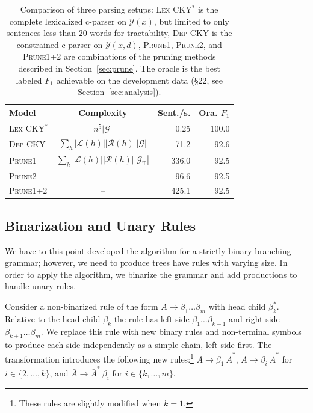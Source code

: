 \documentclass[11pt,letterpaper]{article}
\newcommand{\rules}{\mathcal{G}}
\newcommand{\LeftS}{\mathcal{L} }
\newcommand{\RightS}{\mathcal{R} }
\newcommand{\Rule}[3]{#1 \rightarrow #2\ #3}
\begin{document}
\begin{table}
  \centering
  \footnotesize
  \hspace*{-0.3cm}
  \begin{tabular}{lcrr}
    \toprule
    Model & Complexity & Sent./s. & Ora. $F_1$  \\
    
    \midrule
    \textsc{Lex CKY$^*$} & $n^5|\rules|$ &  0.25  & 100.0  \\
    \textsc{Dep CKY}      & $\sum_h |\LeftS(h)| |\RightS(h)| |\rules|$ &  71.2  & 92.6    \\
    \textsc{Prune1}   & $\sum_h |\LeftS(h)|| \RightS(h)| |\rules_{\mathrm{T}}|$ &  336.0 & 92.5    \\
    \textsc{Prune2}   & -- &  96.6  & 92.5 \\
    \textsc{Prune1+2} & -- &  425.1 & 92.5 \\
    \bottomrule
  \end{tabular}

  \caption{Comparison of three parsing setups: 
    \textsc{Lex CKY$^*$} is the complete lexicalized c-parser on $\mathcal{Y}(x)$,
    but limited to only sentences less than 20 words for tractability,
    \textsc{Dep CKY} is the constrained c-parser on $\mathcal{Y}(x, d)$, \textsc{Prune1}, \textsc{Prune2}, and \textsc{Prune1+2}
    are combinations of the pruning methods described in
    Section~\ref{sec:prune}. The oracle is the best labeled $F_1$ achievable on the
    development data (\S 22, see Section~\ref{sec:analysis}). \label{tab:alg-oracle}}
\end{table}

\subsection{Binarization and Unary Rules}
\label{sec:binary}

We have to this point developed the algorithm for a strictly
binary-branching grammar; however, we need to produce trees have
rules with varying size.  In order to apply the algorithm, we 
binarize the grammar and add productions to 
handle unary rules.

Consider a non-binarized rule of the form
$ A \rightarrow \beta_1 \ldots \beta_m$ with head child
$\beta_k^*$. Relative to the head child $\beta_k$ the rule has
left-side $\beta_1 \ldots \beta_{k-1}$ and right-side
$\beta_{k+1} \ldots \beta_m$. We replace this rule with new binary rules
and non-terminal symbols to produce each side independently as a simple chain, left-side first.  The
transformation introduces the following new rules:\footnote{These rules are slightly
  modified when $k=1$.}  $\Rule{A}{\beta_1}{\bar{A}^{*}}$,
$\Rule{\bar{A}} {\beta_i}{\bar{A}^{*}} $ for $i \in \{2, \ldots, k\}$,
and $\Rule{\bar{A}}{\bar{A}^{*}}{\beta_i}$ for
$i \in \{k, \ldots, m\}$.
\end{document}
